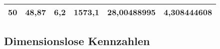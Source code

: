 \begin{table}[ht!]
\begin{tabular}{|l|l|l|l|l|l|}
    \rowcolor[HTML]{E2EFDA} 
    50                                    & 48,87                                  & 6,2                                                & 1573,1                                   & 28,00488995                                          & 4,308444608                                    \\ \hline
    \end{tabular}
    \end{table}
\subsection{Dimensionslose Kennzahlen}